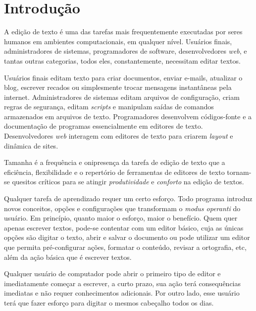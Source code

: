 
\chapter{Introdução}
%
A edição de texto é uma das tarefas mais frequentemente executadas por seres
humanos em ambientes computacionais, em qualquer nível. Usuários finais,
administradores de sistemas, programadores de software, desenvolvedores {\em
web}, e tantas outras categorias, todos eles, constantemente, necessitam
editar textos. 

Usuários finais editam texto para criar documentos, enviar e-mails, atualizar
o blog, escrever recados ou simplesmente trocar mensagens instantâneas pela
internet. Administradores de sistemas editam arquivos de configuração, criam
regras de segurança, editam {\em scripts} e manipulam saídas de comandos
armazenados em arquivos de texto. Programadores desenvolvem códigos-fonte e a
documentação de programas essencialmente em editores de texto.  Desenvolvedores
{\em web} interagem com editores de texto para criarem {\em layout} e dinâmica 
de sites.

Tamanha é a frequência e onipresença da tarefa de edição de texto que a
eficiência, flexibilidade e o repertório de ferramentas de editores de texto
tornam-se quesitos críticos para se atingir {\em produtividade} e {\em
conforto} na edição de textos.

Qualquer tarefa de aprendizado requer um certo esforço. Todo programa 
introduz novos conceitos, opções e configurações que transformam o \textit{
modus operanti} do usuário. Em princípio, quanto maior o esforço, maior o
benefício. Quem quer apenas escrever textos, pode-se contentar com um editor
básico, cuja as únicas opções são digitar o texto, abrir e salvar o documento 
ou pode utilizar um editor que permita pré-configurar ações, formatar o 
conteúdo, revisar a ortografia, etc, além da ação básica que é escrever textos.

Qualquer usuário de computador pode abrir o primeiro tipo de editor e
imediatamente começar a escrever, a curto prazo, sua ação terá consequências
imediatas e não requer conhecimentos adicionais. Por outro lado, esse usuário
terá que fazer esforço para digitar o mesmos cabeçalho todos os dias. 

